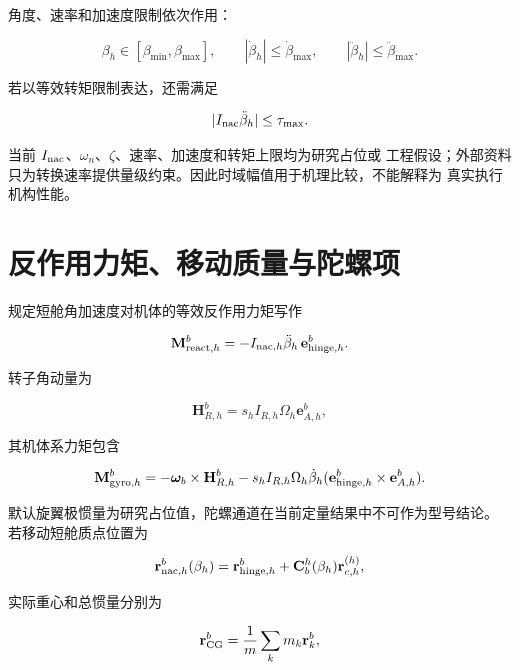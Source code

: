 \documentclass[UTF8,12pt,oneside,openany,fontset=windows]{ctexbook}
\begin{document}
角度、速率和加速度限制依次作用：

\begin{equation}
\beta_h\in[\beta_{\min},\beta_{\max}],\qquad
|\dot\beta_h|\le\dot\beta_{\max},\qquad
|\ddot\beta_h|\le\ddot\beta_{\max}.
\end{equation}

若以等效转矩限制表达，还需满足

\begin{equation}
|I_{\rm nac}\ddot\beta_h|\le\tau_{\max}.
\end{equation}

当前 \(I_{\rm nac}\)、\(\omega_n\)、\(\zeta\)、速率、加速度和转矩上限均为研究占位或 工程假设；外部资料只为转换速率提供量级约束。因此时域幅值用于机理比较，不能解释为 真实执行机构性能。

\section{反作用力矩、移动质量与陀螺项}

规定短舱角加速度对机体的等效反作用力矩写作

\begin{equation}
\mathbf M_{{\rm react},h}^b=-I_{{\rm nac},h}\ddot\beta_h\,\mathbf e_{{\rm hinge},h}^b.
\end{equation}

转子角动量为

\begin{equation}
\mathbf H_{R,h}^b=s_h I_{R,h}\Omega_h\mathbf e_{A,h}^b,
\end{equation}

其机体系力矩包含

\begin{equation}
\mathbf M_{{\rm gyro},h}^b=
-\boldsymbol\omega_b\times\mathbf H_{R,h}^b
-s_hI_{R,h}\Omega_h\dot\beta_h
(\mathbf e_{{\rm hinge},h}^b\times\mathbf e_{A,h}^b).
\end{equation}

默认旋翼极惯量为研究占位值，陀螺通道在当前定量结果中不可作为型号结论。 若移动短舱质点位置为

\begin{equation}
\mathbf r_{{\rm nac},h}^b(\beta_h)=
\mathbf r_{{\rm hinge},h}^b+\mathbf C_b^h(\beta_h)\mathbf r_{c,h}^{(h)},
\end{equation}

实际重心和总惯量分别为

\begin{equation}
\mathbf r_{\rm CG}^b=\frac{1}{m}\sum_km_k\mathbf r_k^b,
\end{equation}
\end{document}
